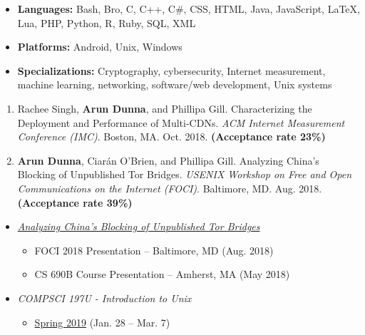 
\begin{itemize}
\item \textbf{Languages:} Bash, Bro, C, C++, C\#, CSS, HTML, Java, JavaScript, LaTeX, Lua, PHP, Python, R, Ruby, SQL, XML
    \item \textbf{Platforms:}
Android, Unix, Windows
        \item \textbf{Specializations:}
    Cryptography, cybersecurity, Internet measurement, machine learning, networking, software/web development, Unix systems

\end{itemize}


\begin{enumerate}
 \item Rachee Singh, \textbf{Arun Dunna}, and Phillipa Gill. Characterizing the Deployment and Performance of Multi-CDNs. \textit{ACM Internet Measurement Conference (IMC)}. Boston, MA. Oct. 2018. \textbf{(Acceptance rate 23\%)}
 \item \textbf{Arun Dunna}, Ciar\'an O'Brien, and Phillipa Gill. Analyzing China's Blocking of Unpublished Tor Bridges. \textit{USENIX Workshop on Free and Open Communications on the Internet (FOCI)}. Baltimore, MD. Aug. 2018. \textbf{(Acceptance rate 39\%)}
\end{enumerate}


\begin{itemize}
\item
    {\it \href{https://adunna.me/foci-2018-tor/}{Analyzing China's Blocking of Unpublished Tor Bridges}}
    \begin{itemize}
        \item FOCI 2018 Presentation -- Baltimore, MD (Aug. 2018)
        \item CS 690B Course Presentation -- Amherst, MA (May 2018)
    \end{itemize}

\end{itemize}


\begin{itemize}
\item
    {\it COMPSCI 197U - Introduction to Unix}
    \begin{itemize}
        \item \href{https://adunna.me/courses/cs197u-s19/}{Spring 2019} (Jan. 28 -- Mar. 7)
    \end{itemize}

\end{itemize}


